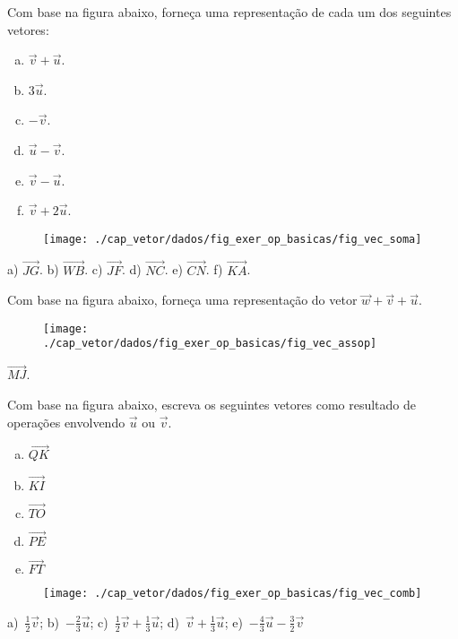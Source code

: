 \begin{exer}
  Com base na figura abaixo, forneça uma representação de cada um dos seguintes vetores:
  \begin{enumerate}[a)]
    \item $\overrightarrow{v}+\overrightarrow{u}$.
    \item $3\vec{u}$.
    \item $-\vec{v}$.
    \item $\vec{u}-\vec{v}$.
    \item $\vec{v}-\vec{u}$.
    \item $\vec{v}+2\vec{u}$.
  \end{enumerate}
   
  \begin{figure}[H]
    \centering
    \texttt{[image: ./cap\_vetor/dados/fig\_exer\_op\_basicas/fig\_vec\_soma]}
  \end{figure}

\end{exer}
\begin{resp}
  a) $\overrightarrow{JG}$. b) $\overrightarrow{WB}$. c) $\overrightarrow{JF}$. d) $\overrightarrow{NC}$. e) $\overrightarrow{CN}$. f) $\overrightarrow{KA}$.
\end{resp}

\begin{exer}
  Com base na figura abaixo, forneça uma representação do vetor $\vec{w}+\vec{v}+\vec{u}$.
  \begin{figure}[H]
    \centering
    \texttt{[image: ./cap\_vetor/dados/fig\_exer\_op\_basicas/fig\_vec\_assop]}
  \end{figure}
\end{exer}
\begin{resp}
  $\overrightarrow{MJ}$.
\end{resp}

\begin{exer}
  Com base na figura abaixo, escreva os seguintes vetores como resultado de operações envolvendo $\vec{u}$ ou $\vec{v}$.
  \begin{enumerate}[a)]
  \item $\overrightarrow{QK}$
  \item $\overrightarrow{KI}$
  \item $\overrightarrow{TO}$
  \item $\overrightarrow{PE}$
  \item $\overrightarrow{FT}$
  \end{enumerate}
  \begin{figure}[H]
    \centering
    \texttt{[image: ./cap\_vetor/dados/fig\_exer\_op\_basicas/fig\_vec\_comb]}
  \end{figure}
\end{exer}
\begin{resp}
  a)~$\frac{1}{2}\vec{v}$; b)~$-\frac{2}{3}\vec{u}$; c)~$\frac{1}{2}\vec{v}+\frac{1}{3}\vec{u}$; d)~$\vec{v}+\frac{1}{3}\vec{u}$; e)~$-\frac{4}{3}\vec{u}-\frac{3}{2}\vec{v}$
\end{resp}


